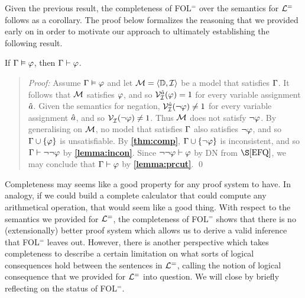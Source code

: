 Given the previous result, the completeness of FOL$^=$ over the semantics for $\mathcal{L}^{=}$ follows as a corollary. 
The proof below formalizes the reasoning that we provided early on in order to motivate our approach to ultimately establishing the following result.



\begin{Cthm}[\sc FOL$^=$ Completeness] \label{cor:Completeness}
  If $\Gamma\vDash\varphi$, then $\Gamma\vdash\varphi$.
\end{Cthm}

\begin{quote} 
  \textit{Proof:} Assume $\Gamma\vDash\varphi$ and let $\mathcal{M}=\langle\mathbb{D},\mathcal{I}\rangle$ be a model that satisfies $\Gamma$.
  It follows that $\mathcal{M}$ satisfies $\varphi$, and so $\mathcal{V}_{\mathcal{I}}^{\hat{a}}(\varphi)=1$ for every variable assignment $\hat{a}$.
  Given the semantics for negation, $\mathcal{V}_{\mathcal{I}}^{\hat{a}}(\neg\varphi)\neq 1$ for every variable assignment $\hat{a}$, and so $\mathcal{V}_{\mathcal{I}}^{}(\neg\varphi)\neq 1$.
  Thus $\mathcal{M}$ does not satisfy $\neg\varphi$.
  By generalising on $\mathcal{M}$, no model that satisfies $\Gamma$ also satisfies $\neg\varphi$, and so $\Gamma\cup\lbrace\varphi\rbrace$ is unsatisfiable. 
  By \textbf{\ref{thm:comp}}, $\Gamma\cup\lbrace\neg\varphi\rbrace$ is inconsistent, and so $\Gamma\vdash\neg\neg\varphi$ by \textbf{\ref{lemma:incon}}.
  Since $\neg\neg\varphi\vdash\varphi$ by DN from $\S\ref{EFQ}$, we may conclude that $\Gamma\vdash\varphi$ by \textbf{\ref{lemma:prcut}}.
  \qed
\end{quote}

Completeness may seems like a good property for any proof system to have.
In analogy, if we could build a complete calculator that could compute any arithmetical operation, that would seem like a good thing.
With respect to the semantics we provided for $\mathcal{L}^{=}$, the completeness of FOL$^=$ shows that there is no (extensionally) better proof system which allows us to derive a valid inference that FOL$^=$ leaves out.
However, there is another perspective which takes completeness to describe a certain limitation on what sorts of logical consequences hold between the sentences in $\mathcal{L}^{=}$, calling the notion of logical consequence that we provided for $\mathcal{L}^{=}$ into question.
We will close by briefly reflecting on the status of FOL$^=$. %







